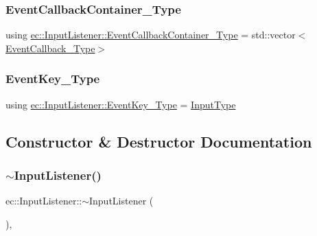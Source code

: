 \mbox{\label{classec_1_1_input_listener_a0d9334fafd46399a39448fe00fad3c2e}} 
\subsubsection{\texorpdfstring{Event\+Callback\+Container\+\_\+\+Type}{EventCallbackContainer\_Type}}
{\footnotesize\ttfamily using \mbox{\hyperlink{classec_1_1_input_listener_a0d9334fafd46399a39448fe00fad3c2e}{ec\+::\+Input\+Listener\+::\+Event\+Callback\+Container\+\_\+\+Type}} =  std\+::vector$<$\mbox{\hyperlink{classec_1_1_input_listener_acc8376886aac460c21a980c411cc1d15}{Event\+Callback\+\_\+\+Type}}$>$}

\mbox{\label{classec_1_1_input_listener_af5dfb691564fa8e05fcf7f053e3c532b}} 
\subsubsection{\texorpdfstring{Event\+Key\+\_\+\+Type}{EventKey\_Type}}
{\footnotesize\ttfamily using \mbox{\hyperlink{classec_1_1_input_listener_af5dfb691564fa8e05fcf7f053e3c532b}{ec\+::\+Input\+Listener\+::\+Event\+Key\+\_\+\+Type}} =  \mbox{\hyperlink{namespaceec_ae2d697393ea83b34b18ab14eb5dacbca}{Input\+Type}}}



\subsection{Constructor \& Destructor Documentation}
\mbox{\label{classec_1_1_input_listener_afd65ca201e735f5758646d6653f42804}} 
\subsubsection{\texorpdfstring{$\sim$\+Input\+Listener()}{~InputListener()}}
{\footnotesize\ttfamily ec\+::\+Input\+Listener\+::$\sim$\+Input\+Listener (\begin{DoxyParamCaption}{ }\end{DoxyParamCaption})\hspace{0.3cm}{\ttfamily [virtual]}, {\ttfamily [default]}}

